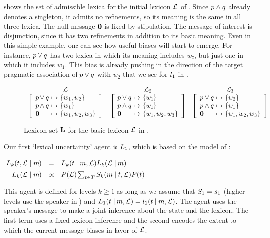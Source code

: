 \documentclass{article}
\begin{document}
 shows the set of admissible lexica for the
initial lexicon $\Lex$ of . Since $\pandq$
already denotes a singleton, it admits no refinements, so its meaning
is the same in all three lexica. The null message $\nullmsg$ is fixed
by stipulation. The message of interest is disjunction, since it has
two refinements in addition to its basic meaning. Even in this simple
example, one can see how useful biases will start to emerge. For
instance, $\porq$ has two lexica in which its meaning includes
$w_{2}$, but just one in which it includes $w_{1}$. This bias is
already pushing in the direction of the target pragmatic association
of $\porq$ with $w_{2}$ that we see for $\listenerOne$ in
.

\begin{figure}[tp]
  \centering
  \setlength{\arraycolsep}{1pt}    
  $\begin{array}[c]{c c c}
     \Lex & \Lex_{2} & \Lex_{3} \\
     \disjlexicon{w_{1}, w_{2}}{w_{1}}
     & 
     \disjlexicon{w_{1}}{w_{1}}
     & 
     \disjlexicon{w_{2}}{w_{1}}
  \end{array}$
  \caption{Lexicon set $\LexSet$ for the basic lexicon $\Lex$ in .}
  \label{fig:disjlexica}
\end{figure}

Our first `lexical uncertainty' agent is $\ListenerK[1]$, which is based
on the model of \citet{Smith:Goodman:Frank:2013}:
%
\begin{examples}
  \item\label{L1}%
    \setlength{\arraycolsep}{2pt}%
    $\mspace{-4mu}\begin{array}[t]{r c l}
      \ListenerK(\state, \Lex \given \msg) 
      &=&
      \ListenerK(\state \given \msg, \Lex) \ListenerK(\Lex \given \msg) 
      \\[1ex]
      \ListenerK(\Lex \given \msg) 
      &\propto& 
      \Prior(\Lex) \sum_{\state\in\States} \SpeakerK(\msg \given \state, \Lex)\Prior(\state)
    \end{array}$
\end{examples}
%
This agent is defined for levels $k \geqslant 1$ as long as we assume
that $\SpeakerK[1] = \speakerOne$ (higher levels use the speaker in
) and
$\ListenerK[1](\state \given \msg, \Lex) = \listenerOne(\state
\given \msg, \Lex)$.
The agent uses the speaker's message to make a joint inference about
the state and the lexicon. The first term uses a fixed-lexicon
inference and the second encodes the extent to which the current
message biases in favor of $\Lex$.
\end{document}
